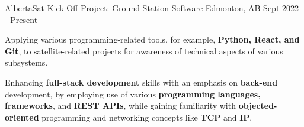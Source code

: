 \begin{cventries}
  \cventry
    {AlbertaSat} %
    {Kick Off Project: Ground-Station Software} %
    {Edmonton, AB} %
    {Sept 2022 - Present} %
    {
      \begin{cvitems} %
        \item {Applying various programming-related tools, for example, \textbf{Python, React, and Git}, to satellite-related projects for awareness of technical aspects of various subsystems.}
        \item {Enhancing \textbf{full-stack development} skills with an emphasis on \textbf{back-end} development, by employing use of various \textbf{programming languages, frameworks}, and \textbf{REST APIs}, while gaining familiarity with \textbf{objected-oriented} programming and networking concepts like \textbf{TCP} and \textbf{IP}.}
      \end{cvitems}
    }

\end{cventries}
